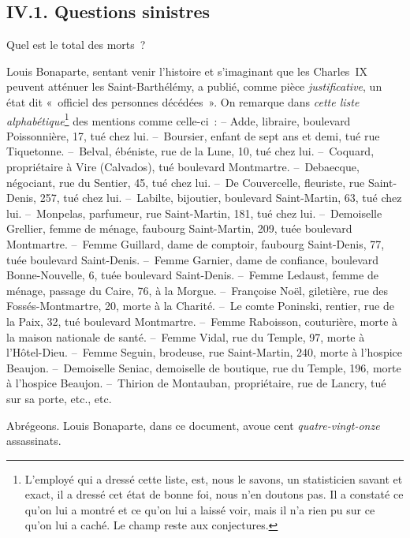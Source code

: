 \documentclass[french,twoside]{book} %
\begin{document}
\subsection[{IV.1. Questions sinistres}]{IV.1. Questions sinistres}
\noindent Quel est le total des morts ?\par
Louis Bonaparte, sentant venir l’histoire et s’imaginant que les Charles IX peuvent atténuer les Saint-Barthélémy, a publié, comme pièce \emph{justificative}, un état dit « officiel des personnes décédées ». On remarque dans \emph{cette liste alphabétique}\footnote{L’employé qui a dressé cette liste, est, nous le savons, un statisticien savant et exact, il a dressé cet état de bonne foi, nous n’en doutons pas. Il a constaté ce qu’on lui a montré et ce qu’on lui a laissé voir, mais il n’a rien pu sur ce qu’on lui a caché. Le champ reste aux conjectures.} des mentions comme celle-ci : – Adde, libraire, boulevard Poissonnière, 17, tué chez lui. – Boursier, enfant de sept ans et demi, tué rue Tiquetonne. – Belval, ébéniste, rue de la Lune, 10, tué chez lui. – Coquard, propriétaire à Vire (Calvados), tué boulevard Montmartre. – Debaecque, négociant, rue du Sentier, 45, tué chez lui. – De Couvercelle, fleuriste, rue Saint-Denis, 257, tué chez lui. – Labilte, bijoutier, boulevard Saint-Martin, 63, tué chez lui. – Monpelas, parfumeur, rue Saint-Martin, 181, tué chez lui. – Demoiselle Grellier, femme de ménage, faubourg Saint-Martin, 209, tuée boulevard Montmartre. – Femme Guillard, dame de comptoir, faubourg Saint-Denis, 77, tuée boulevard Saint-Denis. – Femme Garnier, dame de confiance, boulevard Bonne-Nouvelle, 6, tuée boulevard Saint-Denis. – Femme Ledaust, femme de ménage, passage du Caire, 76, à la Morgue. – Françoise Noël, giletière, rue des Fossés-Montmartre, 20, morte à la Charité. – Le comte Poninski, rentier, rue de la Paix, 32, tué boulevard Montmartre. – Femme Raboisson, couturière, morte à la maison nationale de santé. – Femme Vidal, rue du Temple, 97, morte à l’Hôtel-Dieu. – Femme Seguin, brodeuse, rue Saint-Martin, 240, morte à l’hospice Beaujon. – Demoiselle Seniac, demoiselle de boutique, rue du Temple, 196, morte à l’hospice Beaujon. – Thirion de Montauban, propriétaire, rue de Lancry, tué sur sa porte, etc., etc.\par
Abrégeons. Louis Bonaparte, dans ce document, avoue cent \emph{quatre-vingt-onze} assassinats.\par
\end{document}
